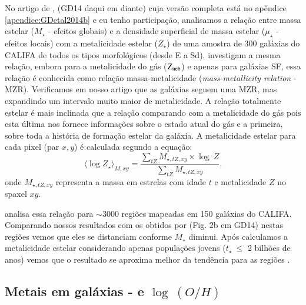 No artigo de \citet{GonzalezDelgado.etal.2014b}, (GD14 daqui em diante) cuja versão completa está no
apêndice \ref{apendice:GDetal2014b} e eu tenho participação, analisamos a relação entre massa
estelar ($M_\star$ - efeitos globais) e a densidade superficial de massa estelar ($\mu_\star$ -
efeitos locais) com a metalicidade estelar ($Z_\star$) de uma amostra de 300 galáxias do CALIFA de
todos os tipos morfológicos (desde E a Sd). \citet{Tremonti.etal.2004a} investigam a mesma relação,
embora para a metalicidade do gás ($\mathrm{Z}_{\mathrm{neb}}$) e apenas para galáxias SF, essa relação é conhecida como
relação massa-metalicidade ({\em mass-metallicity relation} - MZR). Verificamos em nosso artigo que
as galáxias seguem uma MZR, mas expandindo um intervalo muito maior de metalicidade. A relação
totalmente estelar é mais inclinada que a relação comparando com a metalicidade do gás pois esta
última nos fornece informações sobre o estado atual do gás e a primeira, sobre toda a história de
formação estelar da galáxia. A metalicidade estelar para cada pixel (par $x,y$) é calculada segundo
a equação:
\begin{equation}
 	\label{eq:logZmass}
 	\langle \log Z_\star \rangle_{M,xy} = 
	\frac{ \sum_{tZ} M_{\star,tZ,xy} \times \log\ Z}{
	\sum_{tZ} M_{\star,tZ,xy} }.
\end{equation}
\noindent onde $M_{\star,tZ,xy}$ representa a massa em estrelas com idade $t$ e metalicidade $Z$ no
spaxel $xy$.

\citet{Sanchez.etal.2013a} analisa essa relação para $\sim 3000$ regiões \Hii mapeadas em 150
galáxias do CALIFA. Comparando nossos resultados com os obtidos por \citeauthor{Sanchez.etal.2013a}
(Fig. 2b em GD14) nestas regiões vemos que eles se distanciam conforme $M_\star$ diminui.
Após calculamos a metalicidade estelar considerando apenas populações jovens ($t_\star\ \leq$ 2
bilhões de anos) vemos que o resultado se aproxima melhor da tendência para as regiões \Hii.

\subsection{Metais em galáxias -  e $\log\ (O/H)$}
\label{sec:synvsneb:ZemuZR}

